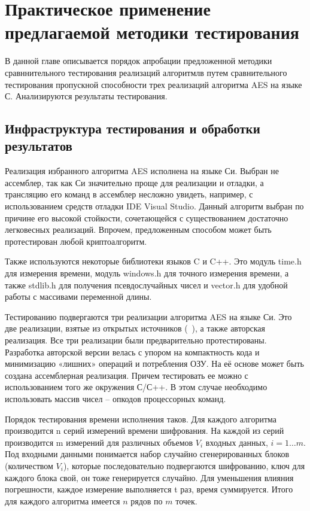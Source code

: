 \chapter{ Практическое применение предлагаемой методики тестирования } \label{ch4}

В данной главе описывается порядок апробации предложенной методики сравннительного тестирования реализаций алгоритмлв путем сравнительного тестирования пропускной способности трех реализаций алгоритма AES на языке С. Анализируются результаты тестирования.
	
\section{Инфраструктура тестирования и обработки результатов} \label{ch4:sec1}

Реализация избранного алгоритма AES исполнена на языке Си. Выбран не ассемблер, так как Си значительно проще для реализации и отладки, а трансляцию его команд в ассемблер несложно увидеть, например, с использованием средств отладки IDE Visual Studio. Данный алгоритм выбран по причине его высокой стойкости, сочетающейся с существованием достаточно легковесных реализаций. Впрочем, предложенным способом может быть протестирован любой криптоалгоритм.

Также используются некоторые библиотеки языков C и C++. Это модуль time.h для измерения времени, модуль windows.h для точного измерения времени, а также stdlib.h для получения псевдослучайных чисел и vector.h для удобной работы с массивами переменной длины.

Тестированию подвергаются три реализации алгоритма AES на языке Си. Это две реализации, взятые из открытых источников (~\cite{src72,src73}), а также авторская реализация. Все три реализации были предварительно протестированы. Разработка авторской версии велась с упором на компактность кода и минимизацию «лишних» операций и потребления ОЗУ. На её основе может быть создана ассемблерная реализация. Причем тестировать ее можно с использованием того же окружения С/С++. В этом случае необходимо использовать массив чисел – опкодов процессорных команд.

Порядок тестирования времени исполнения таков. Для каждого алгоритма производится n серий измерений времени шифрования. На каждой из серий производится m измерений для различных объемов $V_i$ входных данных, $i=1…m$. Под входными данными понимается набор случайно сгенерированных блоков (количеством $V_i$), которые последовательно подвергаются шифрованию, ключ для каждого блока свой, он тоже генерируется случайно. Для уменьшения влияния погрешности, каждое измерение выполняется t раз, время суммируется. Итого для каждого алгоритма имеется $n$ рядов по $m$ точек.

